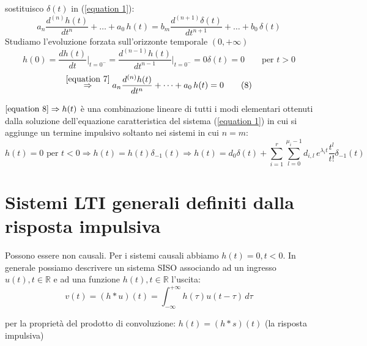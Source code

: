sostituisco $\delta (t)$ in (\ref{equation 1}):
\begin{equation}
	a_n \frac{d^{(n)} h(t)}{dt^n}+\dots+a_0\,h(t) = b_m \frac{d^{(n+1)} \delta(t)}{dt^{n+1}}+\dots+b_0\,\delta(t) %
	\tag{7}\label{equation 7}
\end{equation}
Studiamo l'evoluzione forzata sull'orizzonte temporale $(0,+\infty)$ %
\[ %
	h(0) = \frac{dh(t)}{dt}\bigg\vert_{t=0^-}
	=\frac{d^{(n-1)}h(t)}{dt^{n-1}}\bigg\vert_{t=0^-}
	= 0
	\delta(t) = 0 \qquad\text{per } t>0
\]
\begin{equation}
	\overset{\eqref{equation 7}}{\Rightarrow}a_n \frac{d^{(n)} h(t)}{dt^n}+\dots+a_0\,h(t) = 0 
	\tag{8}\label{equation 8}
\end{equation}
	
\begin{osservazione}
	$\eqref{equation 8} \Rightarrow h (t)$ è una combinazione lineare di tutti i modi elementari ottenuti dalla soluzione dell'equazione caratteristica del sistema (\ref{equation 1}) in cui si aggiunge un termine impulsivo soltanto nei sistemi in cui $n=m$:
	\begin{equation}
		h(t)=0 \text{ per } t<0 \Rightarrow h(t) = h(t)\delta_{-1} (t)
		\Rightarrow h(t)= d_0 \delta(t) + \sum_{i=1}^{r}\sum_{l=0}^{\mu_i-1}d_{i,l} \,e^{\lambda_it}\frac{t^l}{t!}\delta_{-1} (t)
		\tag{9}\label{equation 9}
	\end{equation}
\end{osservazione}



\section{Sistemi LTI generali definiti dalla risposta impulsiva}

Possono essere non causali.
Per i sistemi causali abbiamo $h(t) =0, t<0$.
In generale possiamo descrivere un sistema SISO associando ad un ingresso $u(t), t \in \mathbb{R}$ e ad una funzione $h(t), t \in \mathbb{R}$ l'uscita:
\begin{equation}
	v(t)=(h*u)(t) = \int_{-\infty}^{+\infty}h(\tau)u(t-\tau)\,d\tau
	\tag{10}\label{equation 10}
\end{equation}

\begin{osservazione}
	per la proprietà del prodotto di convoluzione: $h(t)=(h*s)(t)$ (la risposta impulsiva) %
\end{osservazione}

